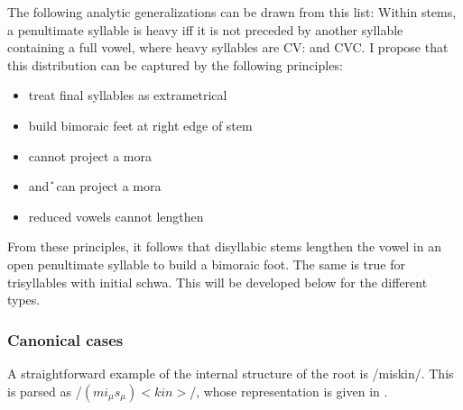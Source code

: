 The following analytic generalizations can be drawn from this list: Within stems, a penultimate syllable is heavy iff it is not preceded by another syllable containing a full vowel, where heavy syllables are CV: and CVC. I propose that this distribution can be captured by the following principles:

\begin{itemize}
 \item treat final syllables as extrametrical
 \item build bimoraic feet at right edge of stem
 \item \E{} cannot project a mora
 \item \I{} and \U{} can project a mora
 \item reduced vowels  cannot lengthen
\end{itemize}

From these principles, it follows that disyllabic stems lengthen the vowel in an open penultimate syllable to build a bimoraic foot. The same is true for trisyllables with initial schwa. This will be developed below for the different types.

\subsubsection{Canonical cases}\label{sec:phon:Canonicalcasesroots}

A straightforward example of the internal structure of the root is /miskin/. This is parsed as /$(mi_{\mu}s_{\mu})<kin>$/, whose representation is given in .

